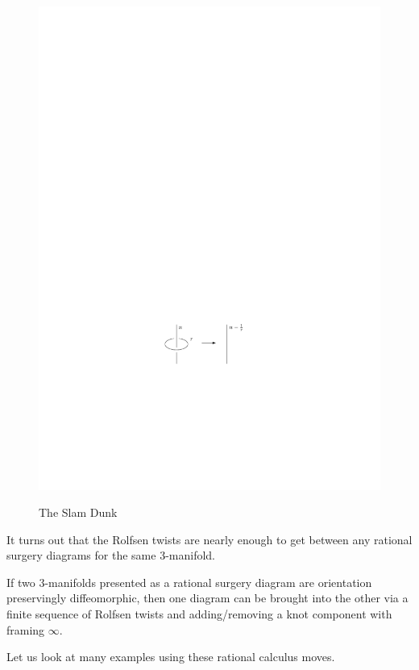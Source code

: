 \begin{figure}[tb]
\centering
\ \ \ \ \ \ \includegraphics[scale=1]{graphics/slam-dunk}
\caption{The Slam Dunk}
\label{slam-dunk}
\end{figure}


It turns out that the Rolfsen twists are nearly enough to get between any rational surgery diagrams for the same 3-manifold.
\begin{thm}
If two 3-manifolds presented as a rational surgery diagram are orientation preservingly diffeomorphic, then one diagram can be brought into the other via a finite sequence of Rolfsen twists and adding/removing a knot component with framing $\infty$.
\end{thm}

Let us look at many examples using these rational calculus moves.

